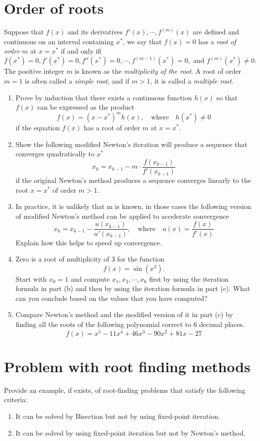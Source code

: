 \section{Order of roots}
Suppose that \(f(x)\) and its derivatives \(f'(x),\cdots, f^{(m)}(x)\) are defined and continuous on an
interval containing $x^*$, we say that \(f(x)=0\) has a \emph{root of order} $m$ at \(x=x^*\) if and only ifi
\[ f(x^*)=0, f'(x^*)=0, f''(x^*)=0, \cdots, f^{(m-1)}(x^*)=0, \text{ and } f^{(m)}(x^*)\neq0. \]
The positive integer $m$ is known as the \emph{multiplicity of the root}.
A root of order \(m=1\) is often called a \emph{simple root}, and if \(m>1\), it is called a \emph{multiple root}.
\begin{enumerate}
	\item Prove by induction that there exists a continuous function \(h(x)\) so that \(f(x)\) can be expressed as the product
	\[ f(x)=(x-x^*)^m h(x), \quad \text{where} \quad h(x^*)\neq0 \]
	if the equation \(f(x)\) has a root of order $m$ at \(x=x^*\).
	\item Show the following modified Newton's iteration will produce a sequence that converges quadratically to $x^*$
	\[ x_k=x_{k-1}-m\cdot\frac{f(x_{k-1})}{f'(x_{k-1})} \]
	if the original Newton's method produces a sequence converges linearly to the root \(x=x^*\) of order \(m>1\).
	\item In practice, it is unlikely that m is known, in those cases the following version of modified Newton's method can be applied to accelerate convergence
	\[ x_k=x_{k-1}-\frac{u(x_{k-1})}{u'(x_{k-1})}, \quad \text{where} \quad u(x)=\frac{f(x)}{f'(x)} \]
	Explain how this helps to speed up convergence.
	\item Zero is a root of multiplicity of 3 for the function
	\[ f(x)=\sin(x^3). \]
	Start with \(x_0=1\) and compute \(x_1, x_2, \cdots, x_6\) first by using the iteration formula in part (b) and then by using the iteration formula in part (c).
	What can you conclude based on the values that you have computed?
	\item Compare Newton's method and the modified version of it in part (c) by finding all the roots of the following polynomial correct to 6 decimal places.
	\[ f(x)=x^5 - 11x^4 + 46x^3 - 90x^2 + 81x - 27 \]
\end{enumerate}



\section{Problem with root finding methods}
Provide an example, if exists, of root-finding problems that satisfy the following criteria:
\begin{enumerate}
	\item It can be solved by Bisection but not by using fixed-point iteration.
	\item It can be solved by using fixed-point iteration but not by Newton's method.
\end{enumerate}


